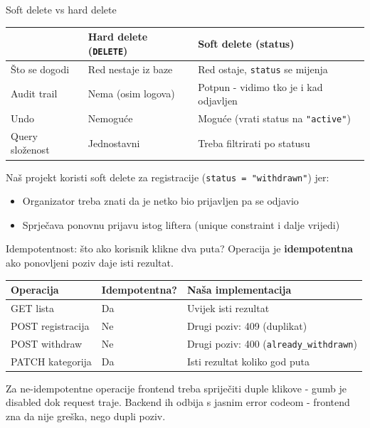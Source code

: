 \begin{frame}{Soft delete vs hard delete}
\begin{tabular}{@{}lp{5cm}p{5cm}@{}}
  \toprule
  & \textbf{Hard delete} (\texttt{DELETE}) & \textbf{Soft delete} (status) \\
  \midrule
  Što se dogodi & Red nestaje iz baze & Red ostaje, \texttt{status} se mijenja \\
  Audit trail & Nema (osim logova) & Potpun - vidimo tko je i kad odjavljen \\
  Undo & Nemoguće & Moguće (vrati status na \texttt{"active"}) \\
  Query složenost & Jednostavni & Treba filtrirati po statusu \\
  \bottomrule
\end{tabular}

\vspace{0.6em}
Naš projekt koristi soft delete za registracije (\texttt{status = "withdrawn"}) jer:
\begin{itemize}
  \item Organizator treba znati da je netko bio prijavljen pa se odjavio
  \item Sprječava ponovnu prijavu istog liftera (unique constraint i dalje vrijedi)
\end{itemize}
\end{frame}

\begin{frame}{Idempotentnost: što ako korisnik klikne dva puta?}
Operacija je \textbf{idempotentna} ako ponovljeni poziv daje isti rezultat.

\vspace{0.6em}
\begin{tabular}{@{}lll@{}}
  \toprule
  \textbf{Operacija} & \textbf{Idempotentna?} & \textbf{Naša implementacija} \\
  \midrule
  GET lista & Da & Uvijek isti rezultat \\
  POST registracija & Ne & Drugi poziv: 409 (duplikat) \\
  POST withdraw & Ne & Drugi poziv: 400 (\texttt{already\_withdrawn}) \\
  PATCH kategorija & Da & Isti rezultat koliko god puta \\
  \bottomrule
\end{tabular}

\vspace{0.6em}
Za ne-idempotentne operacije frontend treba spriječiti duple klikove - gumb je disabled dok request traje.
Backend ih odbija s jasnim error codeom - frontend zna da nije greška, nego dupli poziv.
\end{frame}

